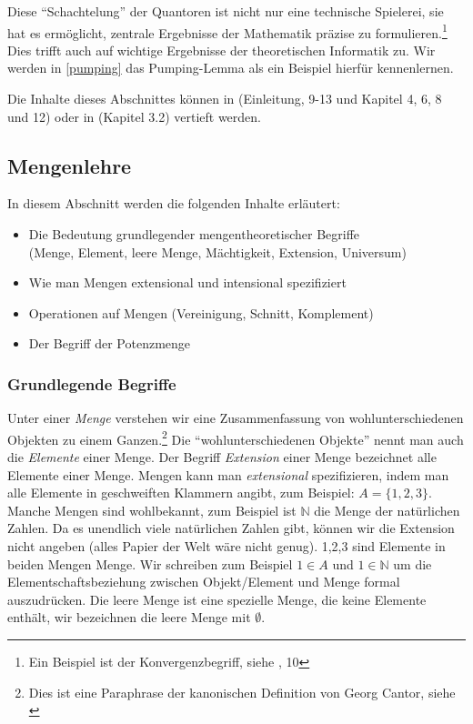 Diese ``Schachtelung'' der Quantoren ist nicht nur eine technische Spielerei,
sie hat es ermöglicht, zentrale Ergebnisse der Mathematik präzise zu formulieren.\footnote{
    Ein Beispiel ist der Konvergenzbegriff, siehe \cite{link}, 10
}
Dies trifft auch auf wichtige Ergebnisse der theoretischen Informatik zu.
Wir werden in \autoref{pumping} das Pumping-Lemma als ein Beispiel hierfür kennenlernen.

Die Inhalte dieses Abschnittes können in \cite{link}
(Einleitung, 9-13 und Kapitel 4, 6, 8 und 12)
oder in \cite{hoffmann} (Kapitel 3.2)
vertieft werden.

\subsection{Mengenlehre}\label{mengenlehre}
In diesem Abschnitt werden die folgenden Inhalte erläutert:
\begin{itemize}
    \item Die Bedeutung grundlegender mengentheoretischer Begriffe\\
        (Menge, Element, leere Menge, Mächtigkeit, Extension, Universum)
    \item Wie man Mengen extensional und intensional spezifiziert
    \item Operationen auf Mengen (Vereinigung, Schnitt, Komplement)
    \item Der Begriff der Potenzmenge
\end{itemize}
\subsubsection{Grundlegende Begriffe}\label{grundmenge}
Unter einer \emph{Menge} verstehen wir eine Zusammenfassung von wohlunterschiedenen Objekten
zu einem Ganzen.\footnote{
    Dies ist eine Paraphrase der kanonischen Definition von Georg Cantor, siehe \cite{cantor}
}
Die ``wohlunterschiedenen Objekte'' nennt man auch die \emph{Elemente} einer Menge.
Der Begriff \emph{Extension} einer Menge bezeichnet alle Elemente einer Menge.
Mengen kann man \emph{extensional} spezifizieren,
indem man alle Elemente in geschweiften Klammern angibt,
zum Beispiel: $A = \{ 1,2,3 \}$.
Manche Mengen sind wohlbekannt,
zum Beispiel ist $\mathbb{N}$ die Menge der natürlichen Zahlen.
Da es unendlich viele natürlichen Zahlen gibt,
können wir die Extension nicht angeben
(alles Papier der Welt wäre nicht genug).
1,2,3 sind Elemente in beiden Mengen Menge.
Wir schreiben zum Beispiel $1 \in A$ und $1 \in \mathbb{N}$
um die Elementschaftsbeziehung zwischen Objekt/Element und Menge formal auszudrücken.
Die leere Menge ist eine spezielle Menge, die keine Elemente enthält,
wir bezeichnen die leere Menge mit $\emptyset$.

